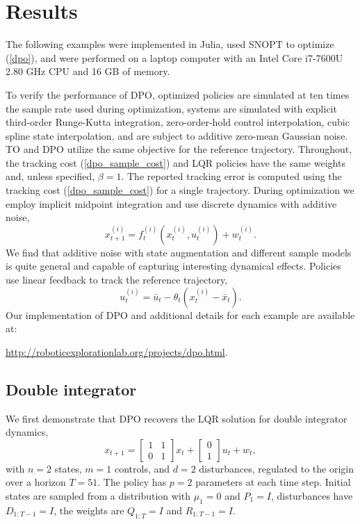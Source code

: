 \section{Results}\label{dpo_results}
The following examples were implemented in Julia, used SNOPT to optimize (\ref{dpo}), and were performed on a laptop computer with an Intel Core i7-7600U 2.80 GHz CPU and 16 GB of memory.

To verify the performance of DPO, optimized policies are simulated at ten times the sample rate used during optimization, systems are simulated with explicit third-order Runge-Kutta integration, zero-order-hold control interpolation, cubic spline state interpolation, and are subject to additive zero-mean Gaussian noise. TO and DPO utilize the same objective for the reference trajectory. Throughout, the tracking cost (\ref{dpo_sample_cost}) and LQR policies have the same weights and, unless specified, $\beta = 1$. The reported tracking error is computed using the tracking cost (\ref{dpo_sample_cost}) for a single trajectory. During optimization we employ implicit midpoint integration and use discrete dynamics with additive noise,
\begin{equation}
	x^{(i)}_{t+1} = f^{(i)}_t(x^{(i)}_t,u^{(i)}_t) + w^{(i)}_t.
	\label{dpo_dynamics_add_noise}
\end{equation} We find that additive noise with state augmentation and different sample models is quite general and capable of capturing interesting dynamical effects. Policies use linear feedback to track the reference trajectory,
\begin{equation}
	u^{(i)}_t = \bar{u}_t - \theta_t (x^{(i)}_t - \bar{x}_t). \label{dpo_linear_policy}
\end{equation}
Our implementation of DPO and additional details for each example are available at: 
\begin{center}
\url{http://roboticexplorationlab.org/projects/dpo.html}.
\end{center}

\subsection{Double integrator}
We first demonstrate that DPO recovers the LQR solution for double integrator dynamics,
\begin{equation}
	x_{t+1} = \begin{bmatrix} 1 & 1 \\ 0 & 1 \end{bmatrix}x_t + \begin{bmatrix} 0 \\ 1 \end{bmatrix}u_t + w_t, \label{dpo_double_integrator_dynamics}
\end{equation}
with $n = 2$ states, $m = 1$ controls, and $d = 2$ disturbances, regulated to the origin over a horizon $T = 51$. The policy has $p = 2$ parameters at each time step. Initial states are sampled from a distribution with $\mu_1 = 0$ and $P_1 = I$, disturbances have $D_{1:T-1} = I$, the weights are $Q_{1:T} = I$ and $R_{1:T-1} = I$.

